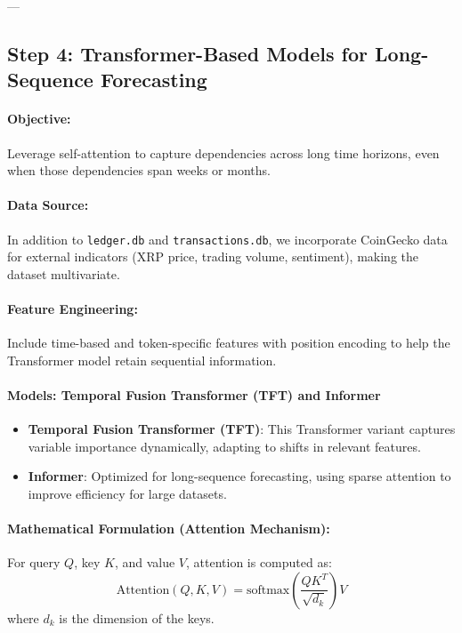 \documentclass{article}
\begin{document}
---

\subsection{Step 4: Transformer-Based Models for Long-Sequence Forecasting}

\paragraph{Objective:} Leverage self-attention to capture dependencies across long time horizons, even when those dependencies span weeks or months.

\paragraph{Data Source:}
In addition to \texttt{ledger.db} and \texttt{transactions.db}, we incorporate CoinGecko data for external indicators (XRP price, trading volume, sentiment), making the dataset multivariate.

\paragraph{Feature Engineering:}
Include time-based and token-specific features with position encoding to help the Transformer model retain sequential information.

\paragraph{Models: Temporal Fusion Transformer (TFT) and Informer}
\begin{itemize}
    \item \textbf{Temporal Fusion Transformer (TFT)}: This Transformer variant captures variable importance dynamically, adapting to shifts in relevant features.
    \item \textbf{Informer}: Optimized for long-sequence forecasting, using sparse attention to improve efficiency for large datasets.
\end{itemize}

\paragraph{Mathematical Formulation (Attention Mechanism):}
For query $Q$, key $K$, and value $V$, attention is computed as:
\[
\text{Attention}(Q, K, V) = \text{softmax}\left(\frac{QK^T}{\sqrt{d_k}}\right) V
\]
where $d_k$ is the dimension of the keys.
\end{document}
